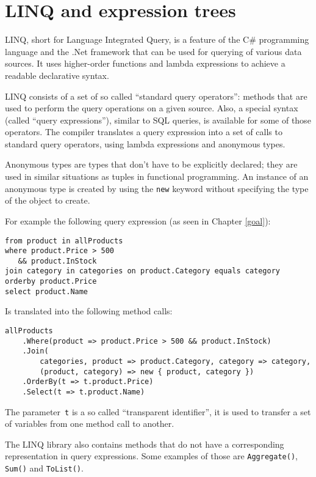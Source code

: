 \chapter{LINQ and expression trees}

LINQ, short for Language Integrated Query, is a feature of the C\# programming language
and the .Net framework that can be used for querying of various data sources.
It uses higher-order functions and lambda expressions to achieve a readable declarative syntax.

LINQ consists of a set of so called “standard query operators”:
methods that are used to perform the query operations on a given source.
Also, a special syntax (called “query expressions”), similar to SQL queries, is available
for some of those operators.
The compiler translates a query expression into a set of calls to standard query operators,
using lambda expressions and anonymous types.

Anonymous types are types that don't have to be explicitly declared;
they are used in similar situations as tuples in functional programming.
An instance of an anonymous type is created by using the \lstinline{new} keyword
without specifying the type of the object to create.

For example the following query expression (as seen in Chapter \ref{goal}):

\begin{lstlisting}
from product in allProducts
where product.Price > 500
   && product.InStock
join category in categories on product.Category equals category
orderby product.Price
select product.Name
\end{lstlisting}

Is translated into the following method calls:

\begin{lstlisting}
allProducts
    .Where(product => product.Price > 500 && product.InStock)
    .Join(
        categories, product => product.Category, category => category,
        (product, category) => new { product, category })
    .OrderBy(t => t.product.Price)
    .Select(t => t.product.Name)
\end{lstlisting}

The parameter~\lstinline,t, is a so called “transparent identifier”, it is used to transfer a set of variables from one method call to another.

The LINQ library also contains methods that do not have a corresponding representation in query expressions. Some examples of those are \lstinline,Aggregate(),, \lstinline,Sum(), and \lstinline,ToList(),.

